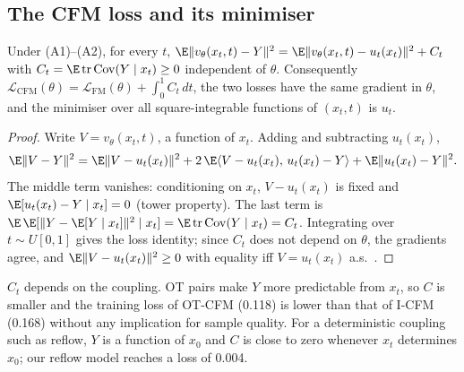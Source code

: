 \subsection{The CFM loss and its minimiser}\label{app:d1}
\begin{proposition}\label{prop:loss}
Under (A1)--(A2), for every $t$,
$\E\|v_\theta(x_t,t)-Y\|^2=\E\|v_\theta(x_t,t)-u_t(x_t)\|^2+C_t$ with $C_t=\E\operatorname{tr}\operatorname{Cov}(Y\mid x_t)\ge0$ independent of $\theta$. Consequently $\mathcal L_{\mathrm{CFM}}(\theta)=\mathcal L_{\mathrm{FM}}(\theta)+\int_0^1C_t\,dt$, the two losses have the same gradient in $\theta$, and the minimiser over all square-integrable functions of $(x_t,t)$ is $u_t$.
\end{proposition}
\begin{proof}
Write $V=v_\theta(x_t,t)$, a function of $x_t$. Adding and subtracting $u_t(x_t)$,
\[
\E\|V-Y\|^2=\E\|V-u_t(x_t)\|^2+2\,\E\langle V-u_t(x_t),\,u_t(x_t)-Y\rangle+\E\|u_t(x_t)-Y\|^2 .
\]
The middle term vanishes: conditioning on $x_t$, $V-u_t(x_t)$ is fixed and $\E[u_t(x_t)-Y\mid x_t]=0$ (tower property). The last term is $\E\,\E[\|Y-\E[Y\mid x_t]\|^2\mid x_t]=\E\operatorname{tr}\operatorname{Cov}(Y\mid x_t)=C_t$. Integrating over $t\sim U[0,1]$ gives the loss identity; since $C_t$ does not depend on $\theta$, the gradients agree, and $\E\|V-u_t(x_t)\|^2\ge0$ with equality iff $V=u_t(x_t)$ a.s.\ \citep[cf.][Theorem~2]{lipman2023fm}.
\end{proof}
\begin{remark}
$C_t$ depends on the coupling. OT pairs make $Y$ more predictable from $x_t$, so $C$ is smaller and the training loss of OT-CFM (0.118) is lower than that of I-CFM (0.168) without any implication for sample quality. For a deterministic coupling such as reflow, $Y$ is a function of $x_0$ and $C$ is close to zero whenever $x_t$ determines $x_0$; our reflow model reaches a loss of 0.004.
\end{remark}

